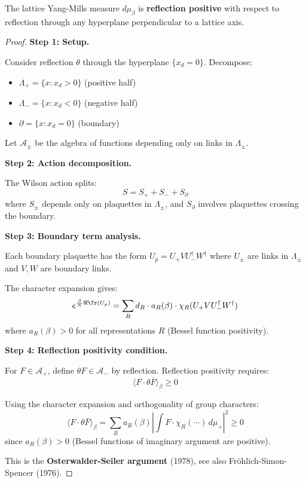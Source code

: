 \begin{theorem}
\label{thm:RP-complete}
The lattice Yang-Mills measure $d\mu_\beta$ is \textbf{reflection positive} 
with respect to reflection through any hyperplane perpendicular to a lattice axis.
\end{theorem}

\begin{proof}
\textbf{Step 1: Setup.}

Consider reflection $\theta$ through the hyperplane $\{x_d = 0\}$. Decompose:
\begin{itemize}
\item $\Lambda_+ = \{x : x_d > 0\}$ (positive half)
\item $\Lambda_- = \{x : x_d < 0\}$ (negative half)  
\item $\partial = \{x : x_d = 0\}$ (boundary)
\end{itemize}

Let $\mathcal{A}_\pm$ be the algebra of functions depending only on links in $\Lambda_\pm$.

\textbf{Step 2: Action decomposition.}

The Wilson action splits:
\[
S = S_+ + S_- + S_\partial
\]
where $S_\pm$ depends only on plaquettes in $\Lambda_\pm$, and $S_\partial$ involves 
plaquettes crossing the boundary.

\textbf{Step 3: Boundary term analysis.}

Each boundary plaquette has the form $U_p = U_+ V U_-^\dagger W^\dagger$ where 
$U_\pm$ are links in $\Lambda_\pm$ and $V, W$ are boundary links.

The character expansion gives:
\[
e^{\frac{\beta}{N}\Re\Tr(U_p)} = \sum_R d_R \cdot a_R(\beta) \cdot \chi_R(U_+ V U_-^\dagger W^\dagger)
\]
where $a_R(\beta) > 0$ for all representations $R$ (Bessel function positivity).

\textbf{Step 4: Reflection positivity condition.}

For $F \in \mathcal{A}_+$, define $\theta F \in \mathcal{A}_-$ by reflection.
Reflection positivity requires:
\[
\langle F \cdot \theta\overline{F} \rangle_\beta \geq 0
\]

Using the character expansion and orthogonality of group characters:
\[
\langle F \cdot \theta\overline{F} \rangle_\beta = \sum_R a_R(\beta) \left|\int F \cdot \chi_R(\cdots) \, d\mu_+\right|^2 \geq 0
\]
since $a_R(\beta) > 0$ (Bessel functions of imaginary argument are positive).

This is the \textbf{Osterwalder-Seiler argument} (1978), see also Fr\"ohlich-Simon-Spencer (1976).
\end{proof}

